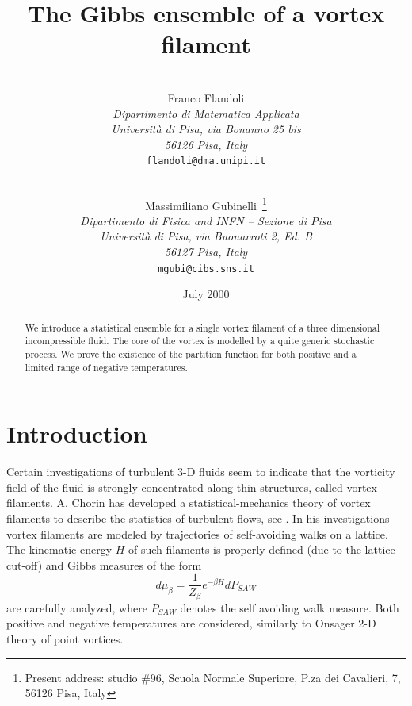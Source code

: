 \title{The Gibbs ensemble of a vortex filament
}
\author{
  \\
  { Franco Flandoli }              \\
  {\small\it Dipartimento di Matematica Applicata} \\ 
  {\small\it Universit\`{a} di Pisa, via Bonanno 25 bis} \\
  {\small\it 56126 Pisa, Italy}          \\
  {\small\tt flandoli@dma.unipi.it} \\
  \and \\
  { Massimiliano Gubinelli~\footnote{Present address: studio \#96, Scuola
      Normale Superiore, P.za dei Cavalieri, 7, 56126  Pisa, Italy} }              \\
  {\small\it Dipartimento di Fisica and INFN -- Sezione di Pisa}    \\
  {\small\it Universit\`a di Pisa, via Buonarroti 2, Ed. B}        \\
  {\small\it 56127 Pisa, Italy}          \\
  {\small\tt mgubi@cibs.sns.it} \\
}

\date{July 2000}





\maketitle

\begin{abstract}
We introduce a statistical ensemble for a single vortex
filament of a three dimensional incompressible fluid. 
The core of the vortex is modelled by a quite generic
stochastic process. We prove the existence of the partition function for
both positive and a limited range of negative temperatures.   
\end{abstract}

\section{Introduction}
Certain investigations of turbulent 3-D fluids seem to indicate that the
vorticity field of the fluid is strongly concentrated along thin structures,
called vortex filaments. A. Chorin has developed a statistical-mechanics
theory of vortex filaments to describe the statistics of turbulent flows,
see \cite{Ch}. In his investigations vortex filaments are modeled by
trajectories of self-avoiding walks on a lattice. 
The kinematic energy $H$ of such
filaments is properly defined (due to the lattice cut-off) and Gibbs
measures of the form 
\begin{equation*}
d\mu _{\beta }=\frac{1}{Z_{\beta }}e^{-\beta H}dP_{SAW}
\end{equation*}
are carefully analyzed, where $P_{SAW}$ denotes the self avoiding walk
measure. Both positive and negative temperatures are considered, similarly to
Onsager 2-D theory of point vortices.

